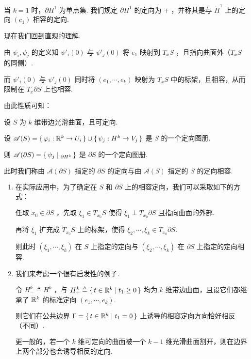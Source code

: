 当 $k=1$ 时，$\partial H^1$ 为单点集. 我们规定 $\partial H^1$ 的定向为 $+$ ，并称其是与 $\mathring{H}^1$ 上的定向 $(e_1)$ 相容的定向.


现在我们回到直观的理解.


由 $\psi_i,\psi_j$ 的定义知 $\psi'_i(0)$ 与 $\psi'_j(0)$ 将 $e_1$ 映射到 $T_xS$ ，且指向曲面外（$T_xS$ 的同侧）.

而 $\psi'_i(0)$ 与 $\psi'_j(0)$ 同时将 $(e_1,\cdots,e_k)$ 映射为 $T_xS$ 中的标架，且相容，从而限制在 $T_x\partial S$ 上也相容.

由此性质可知：

\begin{definition}
    设 $S$ 为 $k$ 维带边光滑曲面，且可定向.

    设 $\mathscr{A}(S)=\set{\varphi_i:\mathbb{R}^k\to U_i}\cup\set{\psi_j:H^k\to V_j}$ 是 $S$ 的一个定向图册.

    则 $\mathscr{A}(\partial S)=\set{\psi_j|_{\partial H^k}}$ 是 $\partial S$ 的一个定向图册.

    此时我们称由 $\mathscr{A}(\partial S)$ 指定的 $\partial S$ 的定向与由 $\mathscr{A}(S)$ 指定的 $S$ 的定向相容.
\end{definition}

\begin{hint}
\begin{enumerate}
    \item 在实际应用中，为了确定在 $S$ 和 $\partial S$ 上的相容定向，我们可以采取如下的方式：
    
    任取 $x_0\in\partial S$ ，先取 $\xi_1\in T_{x_0}S$ 使得 $\xi_1\perp T_{x_0}\partial S$ 且指向曲面的外部.

    再将 $\xi_1$ 扩充成 $T_{x_0}S$ 上的标架，使得 $\xi_2,\cdots,\xi_k\in T_{x_0}\partial S$.

    则此时 $(\xi_1,\cdots,\xi_k)$ 在 $S$ 上指定的定向与 $(\xi_2,\cdots,\xi_k)$ 在 $\partial S$ 上指定的定向相容.


    \item 我们来考虑一个很有启发性的例子.
    
    令 $H^k_-\triangleq H^k$ ，与 $H^k_+\triangleq\set{t\in\mathbb{R}^k|t_1\ge 0}$ 均为 $k$ 维带边曲面，且设它们都继承了 $\mathbb{R}^k$ 的标准定向 $(e_1,\cdots,e_k)$.


    则它们在公共边界 $\Gamma=\set{t\in\mathbb{R}^k|t_1=0}$ 上诱导的相容定向方向恰好相反（不同）.

    更一般的，若一个 $k$ 维可定向的曲面被一个 $k-1$ 维光滑曲面割开，则在边界上两个部分也会诱导相反的定向.

\end{enumerate}
\end{hint}

